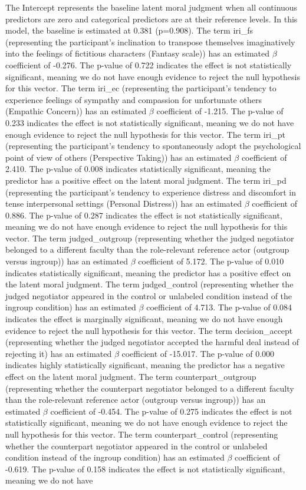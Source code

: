 \documentclass[11pt]{article}
\begin{document}
The Intercept represents the baseline latent moral judgment when all continuous predictors are zero and categorical predictors are at their reference levels. In this model, the baseline is estimated at 0.381 (p=0.908). The term iri\_fs (representing the participant's inclination to transpose themselves imaginatively into the feelings of fictitious characters (Fantasy scale)) has an estimated $\beta$ coefficient of -0.276. The p-value of 0.722 indicates the effect is not statistically significant, meaning we do not have enough evidence to reject the null hypothesis for this vector. The term iri\_ec (representing the participant's tendency to experience feelings of sympathy and compassion for unfortunate others (Empathic Concern)) has an estimated $\beta$ coefficient of -1.215. The p-value of 0.233 indicates the effect is not statistically significant, meaning we do not have enough evidence to reject the null hypothesis for this vector. The term iri\_pt (representing the participant's tendency to spontaneously adopt the psychological point of view of others (Perspective Taking)) has an estimated $\beta$ coefficient of 2.410. The p-value of 0.008 indicates statistically significant, meaning the predictor has a positive effect on the latent moral judgment. The term iri\_pd (representing the participant's tendency to experience distress and discomfort in tense interpersonal settings (Personal Distress)) has an estimated $\beta$ coefficient of 0.886. The p-value of 0.287 indicates the effect is not statistically significant, meaning we do not have enough evidence to reject the null hypothesis for this vector. The term judged\_outgroup (representing whether the judged negotiator belonged to a different faculty than the role-relevant reference actor (outgroup versus ingroup)) has an estimated $\beta$ coefficient of 5.172. The p-value of 0.010 indicates statistically significant, meaning the predictor has a positive effect on the latent moral judgment. The term judged\_control (representing whether the judged negotiator appeared in the control or unlabeled condition instead of the ingroup condition) has an estimated $\beta$ coefficient of 4.713. The p-value of 0.084 indicates the effect is marginally significant, meaning we do not have enough evidence to reject the null hypothesis for this vector. The term decision\_accept (representing whether the judged negotiator accepted the harmful deal instead of rejecting it) has an estimated $\beta$ coefficient of -15.017. The p-value of 0.000 indicates highly statistically significant, meaning the predictor has a negative effect on the latent moral judgment. The term counterpart\_outgroup (representing whether the counterpart negotiator belonged to a different faculty than the role-relevant reference actor (outgroup versus ingroup)) has an estimated $\beta$ coefficient of -0.454. The p-value of 0.275 indicates the effect is not statistically significant, meaning we do not have enough evidence to reject the null hypothesis for this vector. The term counterpart\_control (representing whether the counterpart negotiator appeared in the control or unlabeled condition instead of the ingroup condition) has an estimated $\beta$ coefficient of -0.619. The p-value of 0.158 indicates the effect is not statistically significant, meaning we do not have 
\end{document}
